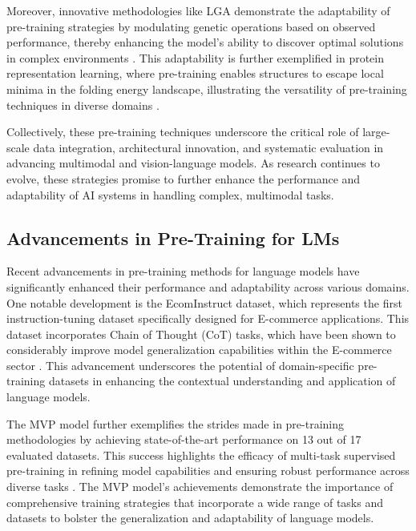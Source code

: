 Moreover, innovative methodologies like LGA demonstrate the adaptability of pre-training strategies by modulating genetic operations based on observed performance, thereby enhancing the model's ability to discover optimal solutions in complex environments \cite{lange2023discoveringattentionbasedgeneticalgorithms}. This adaptability is further exemplified in protein representation learning, where pre-training enables structures to escape local minima in the folding energy landscape, illustrating the versatility of pre-training techniques in diverse domains \cite{huang2023dataefficientprotein3dgeometric}.



Collectively, these pre-training techniques underscore the critical role of large-scale data integration, architectural innovation, and systematic evaluation in advancing multimodal and vision-language models. As research continues to evolve, these strategies promise to further enhance the performance and adaptability of AI systems in handling complex, multimodal tasks.



\subsection{Advancements in Pre-Training for LMs} \label{subsec:Advancements in Pre-Training for LMs}

Recent advancements in pre-training methods for language models have significantly enhanced their performance and adaptability across various domains. One notable development is the EcomInstruct dataset, which represents the first instruction-tuning dataset specifically designed for E-commerce applications. This dataset incorporates Chain of Thought (CoT) tasks, which have been shown to considerably improve model generalization capabilities within the E-commerce sector \cite{li2023ecomgptinstructiontuninglargelanguage}. This advancement underscores the potential of domain-specific pre-training datasets in enhancing the contextual understanding and application of language models.



The MVP model further exemplifies the strides made in pre-training methodologies by achieving state-of-the-art performance on 13 out of 17 evaluated datasets. This success highlights the efficacy of multi-task supervised pre-training in refining model capabilities and ensuring robust performance across diverse tasks \cite{tang2023mvpmultitasksupervisedpretraining}. The MVP model's achievements demonstrate the importance of comprehensive training strategies that incorporate a wide range of tasks and datasets to bolster the generalization and adaptability of language models.




